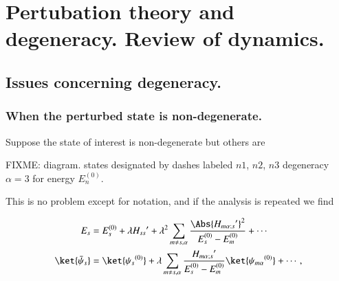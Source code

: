 %
%

\chapter{Pertubation theory and degeneracy.  Review of dynamics.}
\label{chap:qmTwoL5}
{}
\date{Sept 23, 2011}

\beginArtWithToc

%

\section{Issues concerning degeneracy.}

\subsection{When the perturbed state is non-degenerate.}

Suppose the state of interest is non-degenerate but others are

FIXME: diagram.  states designated by dashes labeled $n1$, $n2$, $n3$ degeneracy $\alpha = 3$ for energy $E_n^{(0)}$.

This is no problem except for notation, and if the analysis is repeated we find

\begin{align}\label{eqn:qmTwoL5:10}
E_s &= E_s^{(0)} + \lambda {H_{ss}}' + \lambda^2 
\sum_{m \ne s, \alpha} 
\frac{\Abs{{H_{m \alpha ; s}}'}^2 }
{ E_s^{(0)} - E_m^{(0)} } 
+ \cdots
\\
\ket{\bar{\psi}_s} &= \ket{{\psi_s}^{(0)}} + \lambda
\sum_{m \ne s, \alpha} 
\frac{{H_{m \alpha ; s}}'}
{ E_s^{(0)} - E_m^{(0)} } \ket{{\psi_{m \alpha}}^{(0)}}
+ \cdots,
\end{align}

